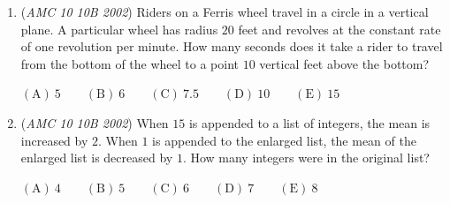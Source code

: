 \begin{enumerate}
	\item (\textit{AMC 10 10B 2002}) Riders on a Ferris wheel travel in a circle in a vertical plane. A particular wheel has radius $20$ feet and revolves at the constant rate of one revolution per minute. How many seconds does it take a rider to travel from the bottom of the wheel to a point $10$ vertical feet above the bottom?


 $\mathrm{(A) \ } 5\qquad \mathrm{(B) \ } 6\qquad \mathrm{(C) \ } 7.5\qquad \mathrm{(D) \ } 10\qquad \mathrm{(E) \ } 15$


	\item (\textit{AMC 10 10B 2002}) When $15$ is appended to a list of integers, the mean is increased by $2$. When $1$ is appended to the enlarged list, the mean of the enlarged list is decreased by $1$. How many integers were in the original list?


 $\mathrm{(A) \ } 4\qquad \mathrm{(B) \ } 5\qquad \mathrm{(C) \ } 6\qquad \mathrm{(D) \ } 7\qquad \mathrm{(E) \ } 8$


\end{enumerate}